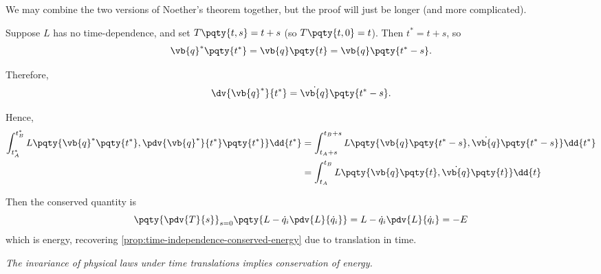 We may combine the two versions of Noether's theorem together, but the proof will just be longer (and more complicated).

\begin{example}
    Suppose \(L\) has no time-dependence, and set \(T\pqty{t, s} = t + s\) (so \(T\pqty{t, 0} = t\)). Then \(t^{\ast} = t + s\), so
    \[
        \vb{q}^{\ast} \pqty{t^{\ast}} = \vb{q} \pqty{t} = \vb{q} \pqty{t^{\ast} - s}.
    \]  

    Therefore,
    \[
        \dv{\vb{q}^{\ast}}{t^{\ast}} = \dot{\vb{q}} \pqty{t^{\ast} - s}.
    \]

    Hence,
    \begin{align*}
        \int_{t_A^{\ast}}^{t_B^{\ast}} L\pqty{\vb{q}^{\ast} \pqty{t^{\ast}}, \pdv{\vb{q}^{\ast}}{t^{\ast}} \pqty{t^{\ast}}} \dd{t^{\ast}} &= \int_{t_A + s}^{t_B + s} L\pqty{\vb{q} \pqty{t^{\ast} - s}, \dot{\vb{q}} \pqty{t^{\ast} - s}} \dd{t^{\ast}} \\
        &= \int_{t_A}^{t_B} L\pqty{\vb{q} \pqty{t}, \dot{\vb{q}} \pqty{t}} \dd{t}
    \end{align*}

    Then the conserved quantity is
    \[
        \pqty{\pdv{T}{s}}_{s = 0} \pqty{L - \dot{q}_i \pdv{L}{\dot{q}_i}} = L - \dot{q}_i \pdv{L}{\dot{q}_i} = -E
    \]
    which is energy, recovering \autoref{prop:time-independence-conserved-energy} due to translation in time.

    \textit{The invariance of physical laws under time translations implies conservation of energy.}
\end{example}